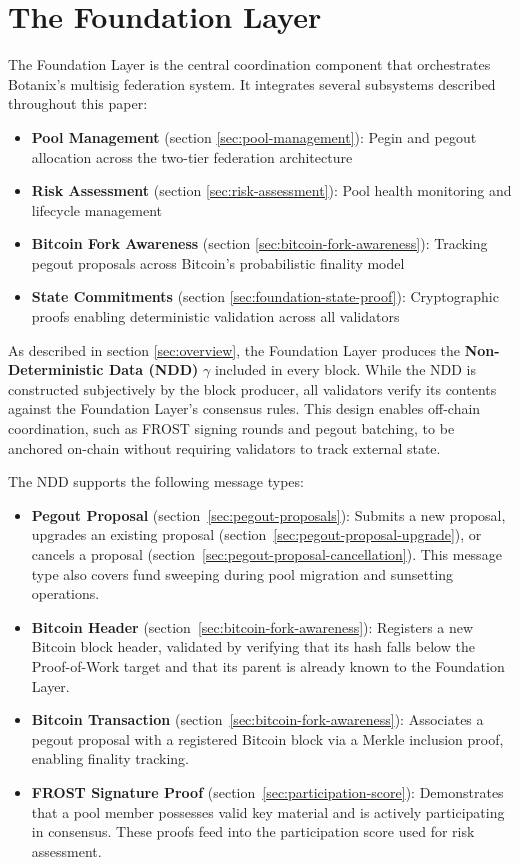 \section{The Foundation Layer}
\label{sec:foundation-layer}

The Foundation Layer is the central coordination component that orchestrates Botanix's multisig federation system. It integrates several subsystems described throughout this paper:

\begin{itemize}
    \item \textbf{Pool Management} (section \ref{sec:pool-management}): Pegin and pegout allocation across the two-tier federation architecture
    \item \textbf{Risk Assessment} (section \ref{sec:risk-assessment}): Pool health monitoring and lifecycle management
    \item \textbf{Bitcoin Fork Awareness} (section \ref{sec:bitcoin-fork-awareness}): Tracking pegout proposals across Bitcoin's probabilistic finality model
    \item \textbf{State Commitments} (section \ref{sec:foundation-state-proof}): Cryptographic proofs enabling deterministic validation across all validators
\end{itemize}

As described in section \ref{sec:overview}, the Foundation Layer produces the \textbf{Non-Deterministic Data (NDD)} $\gamma$ included in every block. While the NDD is constructed subjectively by the block producer, all validators verify its contents against the Foundation Layer's consensus rules. This design enables off-chain coordination, such as FROST signing rounds and pegout batching, to be anchored on-chain without requiring validators to track external state.

The NDD supports the following message types:

\begin{itemize}
    \item \textbf{Pegout Proposal} (section~\ref{sec:pegout-proposals}): Submits a new proposal, upgrades an existing proposal (section~\ref{sec:pegout-proposal-upgrade}), or cancels a proposal (section~\ref{sec:pegout-proposal-cancellation}). This message type also covers fund sweeping during pool migration and sunsetting operations.
    \item \textbf{Bitcoin Header} (section~\ref{sec:bitcoin-fork-awareness}): Registers a new Bitcoin block header, validated by verifying that its hash falls below the Proof-of-Work target and that its parent is already known to the Foundation Layer.
    \item \textbf{Bitcoin Transaction} (section~\ref{sec:bitcoin-fork-awareness}): Associates a pegout proposal with a registered Bitcoin block via a Merkle inclusion proof, enabling finality tracking.
    \item \textbf{FROST Signature Proof} (section~\ref{sec:participation-score}): Demonstrates that a pool member possesses valid key material and is actively participating in consensus. These proofs feed into the participation score used for risk assessment.
\end{itemize}

